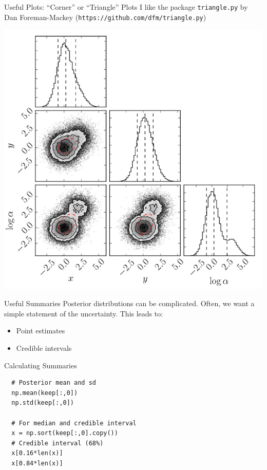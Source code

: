 \begin{frame}[t]{Useful Plots: ``Corner'' or ``Triangle'' Plots}
I like the package {\tt triangle.py} by Dan Foreman-Mackey
({\tt https://github.com/dfm/triangle.py})
\begin{center}
\includegraphics[scale=0.2]{triangle.png}
\end{center}
\end{frame}


\begin{frame}[t]{Useful Summaries}
Posterior distributions can be complicated. Often, we want a simple statement
of the uncertainty. This leads to:

\begin{itemize}
\item Point estimates
\item Credible intervals
\end{itemize}
\end{frame}


\begin{frame}[t, fragile]{Calculating Summaries}
\begin{verbatim}
  # Posterior mean and sd
  np.mean(keep[:,0])
  np.std(keep[:,0])

  # For median and credible interval
  x = np.sort(keep[:,0].copy())
  # Credible interval (68%)
  x[0.16*len(x)]
  x[0.84*len(x)]
\end{verbatim}
\end{frame}


